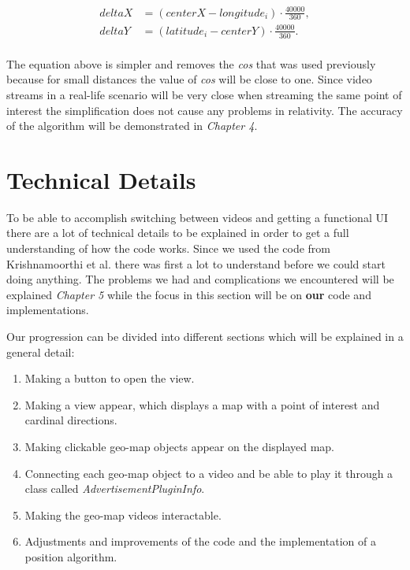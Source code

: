 \begin{align*}
deltaX &= (centerX-longitude_i)\cdot\frac{40000}{360}, \\
deltaY &= (latitude_i-centerY)\cdot\frac{40000}{360}. \\
\end{align*}

The equation above is simpler and removes the \textit{cos} that was used previously because for small distances the value of \textit{cos} will be close to one. Since video streams in a real-life scenario will be very close when streaming the same point of interest the simplification does not cause any problems in relativity. The accuracy of the algorithm will be demonstrated in \textit{Chapter 4}.

\section{Technical Details}
\label{sec:technicaldetails}

To be able to accomplish switching between videos and getting a functional UI there are a lot of technical details to be explained in order to get a full understanding of how the code works. Since we used the code from Krishnamoorthi et al. \cite{qualbranch} there was first a lot to understand before we could start doing anything. The problems we had and complications we encountered will be explained \textit{Chapter 5} while the focus in this section will be on \textbf{our} code and implementations. 

\clearpage
Our progression can be divided into different sections which will be explained in a general detail:

\begin{enumerate}
\item Making a button to open the view.

\item Making a view appear, which displays a map with a point of interest and cardinal directions.

\item Making clickable geo-map objects appear on the displayed map.

\item Connecting each geo-map object to a video and be able to play it through a class called \textit{AdvertisementPluginInfo}.

\item Making the geo-map videos interactable.


\item Adjustments and improvements of the code and the implementation of a position algorithm. 
\end{enumerate}

